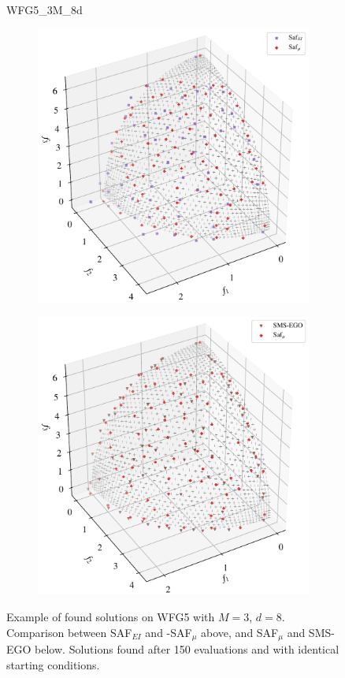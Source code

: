 \documentclass[conference]{IEEEtran}
\begin{document}
\begin{figure}
WFG5\_3M\_8d

\begin{subfigure}[hbt!]{\linewidth}
\includegraphics[width=0.6\linewidth]{figures/_comparison_attainmenPoints_safei_safmu.pdf}
\end{subfigure}
\begin{subfigure}[hbt!]{\linewidth}
\includegraphics[width=0.6\linewidth]{figures/_comparison_attainmenPoints_sms_saf.pdf}
\end{subfigure}
\caption{Example of found solutions on WFG5 with $M=3$, $d=8$. Comparison between SAF$_{EI}$ and -SAF$_{\mu}$ above, and SAF$_{\mu}$ and SMS-EGO below. Solutions found after 150 evaluations and with identical starting conditions.}
\end{figure}
\end{document}

